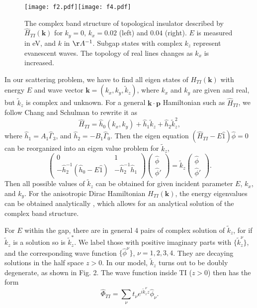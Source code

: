\documentclass[11pt]{report}
\def\v#1{\mathbf{#1}}
\begin{document}
\begin{figure}
\texttt{[image: f2.pdf]}\texttt{[image: f4.pdf]}
\caption{The complex band structure
of topological insulator described by $\hat{H}_{TI}(\v{k})$ 
for $k_y=0$, $k_x=0.02$ (left) and $0.04$ (right). $E$ is measured in eV, and $k$ in $\AA^{-1}$.
Subgap states with complex $k_z$ represent evanescent waves. 
The topology of  real lines \cite{heine63}  changes as $k_x$ is increased.  
}
\end{figure}

In our scattering problem, we have to find all eigen states of $H_{TI}(\v{k})$ with energy $E$ and 
wave vector $\v{k}=(k_x,k_y,\tilde{k}_z)$, where $k_x$ and $k_y$ are given and real, but $\tilde{k}_z$ is 
complex and unknown. For a general $\mathbf{k\cdot p}$ Hamiltonian such as $\hat{H}_{TI}$, 
we follow Chang and Schulman \cite{chang82} to rewrite it as
\[
\hat{H}_{TI}=\hat{h}_0(k_x,k_y)+\hat{h}_1 \tilde{k}_z+\hat{h}_2\tilde{k}^2_z,
\]
where $\hat{h}_1=A_1\hat{\Gamma}_3$, and $\hat{h}_2=-B_1\hat{\Gamma}_0$. 
Then the eigen equation $(\hat{H}_{TI}-E\hat{1})\hat{\phi}=0$ can be reorganized into an 
eigen value problem for $\tilde{k}_z$,
\[
\left(
\begin{array}{ll}
  0 & 1   \\
  -\hat{h}_2^{-1}(\hat{h}_0-E\hat{1}) & -\hat{h}_2^{-1}\hat{h}_1
  \end{array}
\right)
\left(
\begin{array}{l}
  \hat{\phi}   \\
  \hat{\phi}'  
\end{array}
\right)
=\tilde{k}_z \left(
\begin{array}{l}
  \hat{\phi}   \\
  \hat{\phi}'    
\end{array}
\right).
\]
Then all possible values of $\tilde{k}_z$ can be obtained for given incident parameter $E$, $k_x$, and $k_y$. 
For the anisotropic Dirac Hamiltonian $H_{TI}(\v{k})$, the energy eigenvalues can be obtained 
analytically \cite{qi_field}, which allows for an analytical solution of the complex band structure.

For $E$ within the gap, there are in general 4 pairs of complex solution of $\tilde{k}_z$, for if $\tilde{k}_z$ is a solution so is $\tilde{k}^*_z$. 
We label those with positive imaginary parts with $\{\tilde{k}^\nu_z\}$, and the corresponding wave function $\{\hat{\phi}^\nu \}$, $\nu=1,2,3,4$. They are decaying solutions in the half space $z>0$. In our model, $\tilde{k}_z$ turns out to be doubly degenerate, as shown in Fig. 2. The wave function inside TI ($z>0$) then has the form
\[
\hat{\Phi}_{TI}=\sum_{\nu} t_\nu e^{i\tilde{k}^\nu_z z} \hat{\phi}_\nu.
\]
\end{document}
